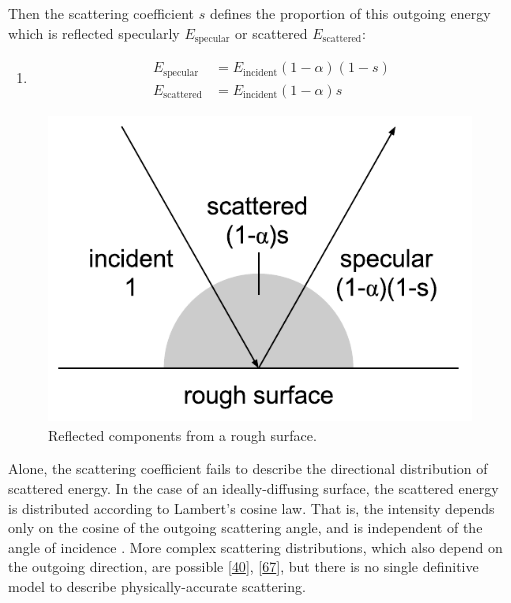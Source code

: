 \documentclass[]{scrreprt}
\providecommand{\tightlist}{%
  \setlength{\itemsep}{0pt}\setlength{\parskip}{0pt}}
\begin{document}
Then the scattering coefficient \(s\) defines the proportion of this
outgoing energy which is reflected specularly \(E_\text{specular}\) or
scattered \(E_\text{scattered}\):

\begin{enumerate}
\def\labelenumi{(\arabic{enumi})}
\setcounter{enumi}{37}
\tightlist
\item
  \[
  \begin{aligned}
  E_{\text{specular}} & =E_{\text{incident}}(1-\alpha)(1-s) \\
  E_{\text{scattered}} & =E_{\text{incident}}(1-\alpha)s
  \end{aligned}
  \]
\end{enumerate}

\begin{figure}[htbp]
\centering
\includegraphics{images/scattering.pdf}
\caption{Reflected components from a rough
surface.\label{fig:scattering}}
\end{figure}

Alone, the scattering coefficient fails to describe the directional
distribution of scattered energy. In the case of an ideally-diffusing
surface, the scattered energy is distributed according to Lambert's
cosine law. That is, the intensity depends only on the cosine of the
outgoing scattering angle, and is independent of the angle of incidence
. More complex scattering distributions, which also
depend on the outgoing direction, are possible
{[}\protect\hyperlink{ref-christensenux5fnewux5f2005}{40}{]},
{[}\protect\hyperlink{ref-duranyux5fanalyticalux5f2015}{67}{]}, but
there is no single definitive model to describe physically-accurate
scattering.
\end{document}
